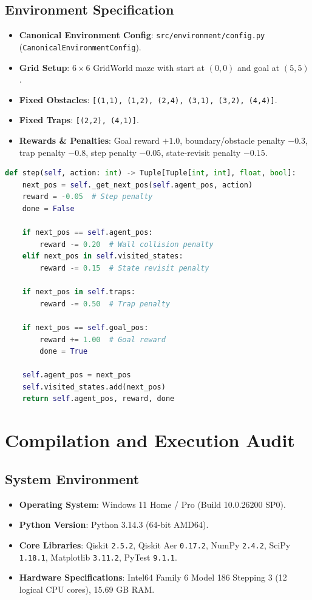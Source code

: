 \documentclass[10pt,article]{article}
\begin{document}
\subsection{Environment Specification}
\begin{itemize}
    \item \textbf{Canonical Environment Config}: \texttt{src/environment/config.py} (\texttt{CanonicalEnvironmentConfig}).
    \item \textbf{Grid Setup}: $6\times 6$ GridWorld maze with start at $(0,0)$ and goal at $(5,5)$.
    \item \textbf{Fixed Obstacles}: \texttt{[(1,1), (1,2), (2,4), (3,1), (3,2), (4,4)]}.
    \item \textbf{Fixed Traps}: \texttt{[(2,2), (4,1)]}.
    \item \textbf{Rewards \& Penalties}: Goal reward $+1.0$, boundary/obstacle penalty $-0.3$, trap penalty $-0.8$, step penalty $-0.05$, state-revisit penalty $-0.15$.
\end{itemize}

\begin{lstlisting}[language=Python, caption={Reward Function Implementation (src/environment/gridworld.py)}]
def step(self, action: int) -> Tuple[Tuple[int, int], float, bool]:
    next_pos = self._get_next_pos(self.agent_pos, action)
    reward = -0.05  # Step penalty
    done = False

    if next_pos == self.agent_pos:
        reward -= 0.20  # Wall collision penalty
    elif next_pos in self.visited_states:
        reward -= 0.15  # State revisit penalty

    if next_pos in self.traps:
        reward -= 0.50  # Trap penalty

    if next_pos == self.goal_pos:
        reward += 1.00  # Goal reward
        done = True

    self.agent_pos = next_pos
    self.visited_states.add(next_pos)
    return self.agent_pos, reward, done
\end{lstlisting}

\newpage
\section{Compilation and Execution Audit}

\subsection{System Environment}
\begin{itemize}
    \item \textbf{Operating System}: Windows 11 Home / Pro (Build 10.0.26200 SP0).
    \item \textbf{Python Version}: Python 3.14.3 (64-bit AMD64).
    \item \textbf{Core Libraries}: Qiskit \texttt{2.5.2}, Qiskit Aer \texttt{0.17.2}, NumPy \texttt{2.4.2}, SciPy \texttt{1.18.1}, Matplotlib \texttt{3.11.2}, PyTest \texttt{9.1.1}.
    \item \textbf{Hardware Specifications}: Intel64 Family 6 Model 186 Stepping 3 (12 logical CPU cores), 15.69 GB RAM.
\end{itemize}
\end{document}
